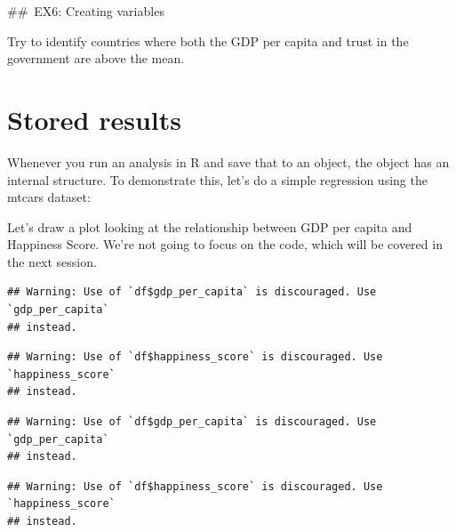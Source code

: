 \documentclass[]{article}
\newenvironment{Shaded}{\begin{snugshade}}{\end{snugshade}}
\newcommand{\AttributeTok}[1]{\textcolor[rgb]{0.77,0.63,0.00}{#1}}
\newcommand{\FunctionTok}[1]{\textcolor[rgb]{0.00,0.00,0.00}{#1}}
\newcommand{\NormalTok}[1]{#1}
\newcommand{\OtherTok}[1]{\textcolor[rgb]{0.56,0.35,0.01}{#1}}
\newcommand{\SpecialCharTok}[1]{\textcolor[rgb]{0.00,0.00,0.00}{#1}}
\begin{document}
\#\#~EX6: Creating variables

Try to identify countries where both the GDP per capita and trust in the
government are above the mean.

\hypertarget{stored-results}{%
\section{Stored results}\label{stored-results}}

Whenever you run an analysis in R and save that to an object, the object
has an internal structure. To demonstrate this, let's do a simple
regression using the mtcars dataset:

Let's draw a plot looking at the relationship between GDP per capita and
Happiness Score. We're not going to focus on the code, which will be
covered in the next session.

\begin{Shaded}
\end{Shaded}

\begin{verbatim}
## Warning: Use of `df$gdp_per_capita` is discouraged. Use `gdp_per_capita`
## instead.
\end{verbatim}

\begin{verbatim}
## Warning: Use of `df$happiness_score` is discouraged. Use `happiness_score`
## instead.
\end{verbatim}

\begin{verbatim}
## Warning: Use of `df$gdp_per_capita` is discouraged. Use `gdp_per_capita`
## instead.
\end{verbatim}

\begin{verbatim}
## Warning: Use of `df$happiness_score` is discouraged. Use `happiness_score`
## instead.
\end{verbatim}
\end{document}
